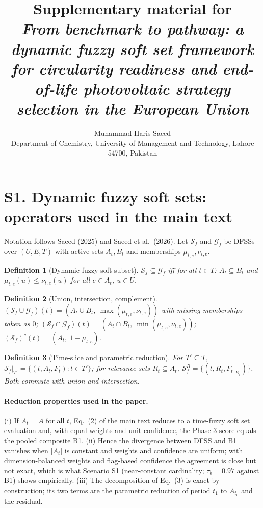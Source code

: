 \documentclass[11pt]{article}
\title{Supplementary material for\\ \emph{From benchmark to pathway: a dynamic fuzzy soft set framework for circularity readiness and end-of-life photovoltaic strategy selection in the European Union}}
\author{Muhammad Haris Saeed\\ Department of Chemistry, University of Management and Technology, Lahore 54700, Pakistan}
\date{}
\newtheorem{definition}{Definition}
\begin{document}
\maketitle

\section*{S1. Dynamic fuzzy soft sets: operators used in the main text}
Notation follows Saeed (2025) and Saeed et al.\ (2026). Let $\mathcal{S}_f$ and $\mathcal{G}_f$ be DFSSs over $(U,E,T)$ with active sets $A_t,B_t$ and memberships $\mu_{t,e},\nu_{t,e}$.

\begin{definition}[Dynamic fuzzy soft subset] $\mathcal{S}_f\subseteq\mathcal{G}_f$ iff for all $t\in T$: $A_t\subseteq B_t$ and $\mu_{t,e}(u)\le\nu_{t,e}(u)$ for all $e\in A_t$, $u\in U$.\end{definition}
\begin{definition}[Union, intersection, complement] $(\mathcal{S}_f\cup\mathcal{G}_f)(t)=(A_t\cup B_t,\ \max(\mu_{t,e},\nu_{t,e}))$ with missing memberships taken as $0$; $(\mathcal{S}_f\cap\mathcal{G}_f)(t)=(A_t\cap B_t,\ \min(\mu_{t,e},\nu_{t,e}))$; $(\mathcal{S}_f)^c(t)=(A_t,\ 1-\mu_{t,e})$.\end{definition}
\begin{definition}[Time-slice and parametric reduction] For $T'\subseteq T$, $\mathcal{S}_f|_{T'}=\{(t,A_t,F_t):t\in T'\}$; for relevance sets $R_t\subseteq A_t$, $\mathcal{S}_f^{R}=\{(t,R_t,F_t|_{R_t})\}$. Both commute with union and intersection.\end{definition}

\paragraph{Reduction properties used in the paper.} (i) If $A_t=A$ for all $t$, Eq.~(2) of the main text reduces to a time-fuzzy soft set evaluation and, with equal weights and unit confidence, the Phase-3 score equals the pooled composite B1. (ii) Hence the divergence between DFSS and B1 vanishes when $|A_t|$ is constant and weights and confidence are uniform; with dimension-balanced weights and flag-based confidence the agreement is close but not exact, which is what Scenario S1 (near-constant cardinality; $\tau_b=0.97$ against B1) shows empirically. (iii) The decomposition of Eq.~(3) is exact by construction; its two terms are the parametric reduction of period $t_1$ to $A_{t_0}$ and the residual.
\end{document}
